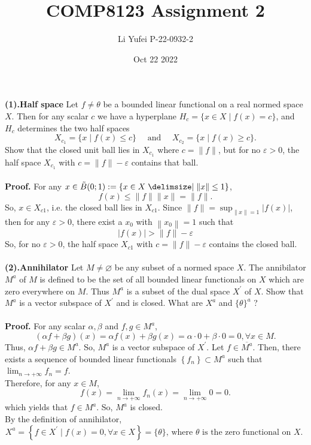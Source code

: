 \documentclass{homework}
\title{COMP8123 \quad Assignment 2}
\author{Li Yufei \quad P-22-0932-2}
\date{Oct 22 2022}
\begin{document}
\maketitle


\textbf{(1).Half space} Let $f \neq \theta$ be a bounded linear functional on a real normed space $X$. Then for any scalar $c$ we have a hyperplane $H_c=\{x \in X \mid f(x)=c\}$, and $H_c$ determines the two half spaces
$$
X_{c_1}=\{x \mid f(x) \le c\} \quad \text { and } \quad X_{c_2}=\{x \mid f(x) \ge c\} .
$$
Show that the closed unit ball lies in $X_{c_1}$ where $c=\|f\|$, but for no $\varepsilon>0$, the half space $X_{c_1}$ with $c=\|f\|-\varepsilon$ contains that ball.
\\
\\
\textbf{Proof.} For any $x \in \Tilde{B}(0 ; 1):=\{x \in X \mid\|x\| \leq 1\}$,
$$
f(x) \leq\|f\|\|x\|=\|f\| .
$$
So, $x \in X_{c 1}$, i.e. the closed ball lies in $X_{c 1}$.
Since $\|f\|=\sup _{\|x\|=1}|f(x)|$, then for any $\varepsilon>0$, there exist a $x_0$ with $\left\|x_0\right\|=1$ such that
$$
|f(x)|>\|f\|-\varepsilon
$$
So, for no $\varepsilon>0$, the half space $X_{c 1}$ with $c=\|f\|-\varepsilon$ contains the closed ball.
\\
\\
\textbf{(2).Annihilator} Let $M \neq \varnothing$ be any subset of a normed space $X$. The annibilator $M^a$ of $M$ is defined to be the set of all bounded linear functionals on $X$ which are zero everywhere on $M$. Thus $M^a$ is a subset of the dual space $X^{\prime}$ of $X$. Show that $M^a$ is a vector subspace of $X^{\prime}$ and is closed. What are $X^a$ and $\{\theta\}^a$ ?
\\
\\
\textbf{Proof.} For any scalar $\alpha, \beta$ and $f, g \in M^a$,
$$
(\alpha f+\beta g)(x)=\alpha f(x)+\beta g(x)=\alpha \cdot 0+\beta \cdot 0=0, \forall x \in M .
$$
Thus, $\alpha f+\beta g \in M^a$. So, $M^a$ is a vector subspace of $X^{\prime}$.
Let $f \in \overline{M^a}$. Then, there exists a sequence of bounded linear functionals $\left\{f_n\right\} \subset M^a$ such that $\lim_{n \rightarrow+\infty} f_n=f$. 
\\Therefore, for any $x \in M$,
$$
f(x)=\lim _{n \rightarrow+\infty} f_n(x)=\lim _{n \rightarrow+\infty} 0=0 .
$$
which yields that $f \in M^a$. So, $M^a$ is closed.
\\By the definition of annihilator,
$$
X^a=\left\{f \in X^{\prime} \mid f(x)=0, \forall x \in X\right\}=\{\theta\} \text {, where } \theta \text { is the zero functional on } X \text {. }
$$
\end{document}

